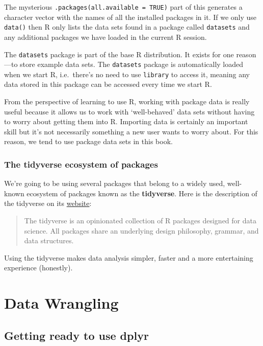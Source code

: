 \documentclass[
]{book}
\begin{document}
The mysterious \texttt{.packages(all.available\ =\ TRUE)} part of this generates a character vector with the names of all the installed packages in it. If we only use \texttt{data()} then R only lists the data sets found in a package called \texttt{datasets} and any additional packages we have loaded in the current R session.

The \texttt{datasets} package is part of the base R distribution. It exists for one reason---to store example data sets. The \texttt{datasets} package is automatically loaded when we start R, i.e.~there's no need to use \texttt{library} to access it, meaning any data stored in this package can be accessed every time we start R.

From the perspective of learning to use R, working with package data is really useful because it allows us to work with `well-behaved' data sets without having to worry about getting them into R. Importing data is certainly an important skill but it's not necessarily something a new user wants to worry about. For this reason, we tend to use package data sets in this book.

\hypertarget{the-tidyverse-ecosystem-of-packages}{%
\section{The tidyverse ecosystem of packages}\label{the-tidyverse-ecosystem-of-packages}}

We're going to be using several packages that belong to a widely used, well-known ecosystem of packages known as the \textbf{tidyverse}. Here is the description of the tidyverse on its \href{https://www.tidyverse.org/}{website}:

\begin{quote}
The tidyverse is an opinionated collection of R packages designed for data science. All packages share an underlying design philosophy, grammar, and data structures.
\end{quote}

Using the tidyverse makes data analysis simpler, faster and a more entertaining experience (honestly).

\hypertarget{part-data-wrangling}{%
\part{Data Wrangling}\label{part-data-wrangling}}

\hypertarget{getting-ready-to-use-dplyr}{%
\chapter{\texorpdfstring{Getting ready to use \textbf{dplyr}}{Getting ready to use dplyr}}\label{getting-ready-to-use-dplyr}}
\end{document}
